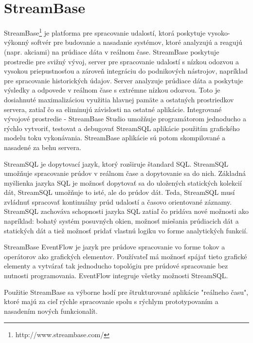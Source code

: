 \section{StreamBase}
StreamBase\footnote{http://www.streambase.com/} je platforma pre spracovanie udalostí, ktorá poskytuje vysoko-výkonný softvér pre budovanie a nasadanie systémov, ktoré analyzujú a reagujú (napr. akciami) na prúdiace dáta v reálnom čase. StreamBase poskytuje prostredie pre svižný vývoj, server pre spracovanie udalostí s nízkou odozvou a vysokou priepustnosťou a zároveň integráciu do podnikových nástrojov, napríklad pre spracovanie historických údajov. Server analyzuje prúdiace dáta a poskytuje výsledky a odpovede v reálnom čase s extrémne nízkou odozvou. Toto je dosiahnuté maximalizáciou využitia hlavnej pamäte a ostatných prostriedkov servera, zatiaľ čo sa eliminujú závislosti na ostatné aplikácie. Integrované vývojové prostredie - StreamBase Studio umožňuje programátorom jednoducho a rýchlo vytvoriť, testovat a debugovať StreamSQL aplikácie použitím grafického modelu toku vykonávania. StreamBase aplikácie sú potom skompilované a nasadené za behu servera.
\par
StreamSQL je dopytovací jazyk, ktorý rozširuje štandard SQL. StreamSQL umožňuje spracovanie prúdov v reálnom čase a dopytovanie sa do nich. Základná myšlienka jazyka SQL je možnosť dopytovať sa do uložených statických kolekcií dát, StreamSQL umožňuje to isté, ale do prúdov dát. Teda, StreamSQL musí zvládnuť spracovať kontinuálny prúd udalostí a časovo orientované záznamy. StreamSQL zachováva schopnosti jazyka SQL zatiaľ čo pridáva nové možnosti ako napríklad: bohatý systém posuvných okien, možnosť miešania prúdiacich dát a statických dát a tiež možnosť pridať vlastnú logiku vo forme analytických funkcií.
\par
StreamBase EventFlow je jazyk pre prúdove spracovanie vo forme tokov a operátorov ako grafických elementov. Používateľ má možnosť spájať tieto grafické elementy a vytvárať tak jednoducho topológiu pre prúdové spracovanie bez nutnosti programovania. EventFlow integruje všetky možnosti StreamSQL.
\par
Použitie StreamBase sa výborne hodí pre štrukturované aplikácie "reálneho času", ktoré majú za cieľ rýchle spracovanie spolu s rýchlym prototypovaním a nasadením nových funkcionalít.
\label{fig:streambase}

